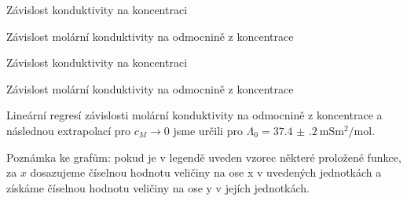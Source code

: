 \begin{graph}[htbp] 
\centering

\caption{Závislost konduktivity  na koncentraci}
\label{g:sCl}
\end{graph}

\begin{graph}[htbp] 
\centering

\caption{Závislost molární konduktivity  na odmocnině z koncentrace}
\label{g:lCl}
\end{graph}

\begin{graph}[htbp] 
\centering

\caption{Závislost konduktivity  na koncentraci}
\label{g:sCH}
\end{graph}

\begin{graph}[htbp] 
\centering

\caption{Závislost molární konduktivity  na odmocnině z koncentrace}
\label{g:lCH}
\end{graph}

Lineární regresí závislosti molární konduktivity na odmocnině z koncentrace a následnou extrapolací pro $c_M \to 0$ jsme určili pro  $\Lambda_0=\SI{37.4(2)}{\milli\siemens\metre\squared\per\mole}$.

Poznámka ke grafům: pokud je v legendě uveden vzorec některé proložené funkce, za $x$ dosazujeme číselnou hodnotu veličiny na ose x v uvedených jednotkách a získáme číselnou hodnotu veličiny na ose y v jejích jednotkách.